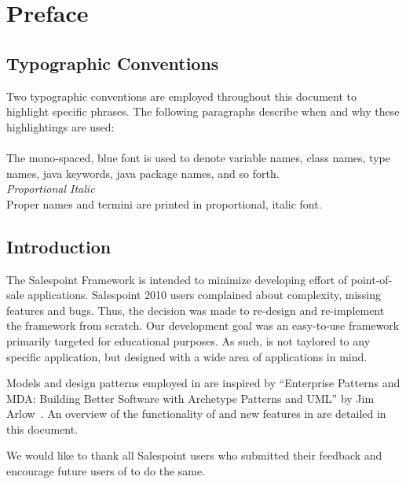 \chapter{Preface}

\section{Typographic Conventions}
Two typographic conventions are employed throughout this document to highlight specific phrases.
The following paragraphs describe when and why these highlightings are used:
\\

\\

The mono-spaced, blue font is used to denote variable names, class names, type names, java keywords, java package names, and so forth.
\\

\textit{Proportional Italic}
\\

Proper names and termini are printed in proportional, italic font.
\\

\section{Introduction}
The Salespoint Framework is intended to minimize developing effort of point-of-sale applications.
Salespoint 2010 users complained about complexity, missing features and bugs.
Thus, the decision was made to re-design and re-implement the framework from scratch.
Our development goal was an easy-to-use framework primarily targeted for educational purposes.
As such, \salespoint{} is not taylored to any specific application, but designed with a wide area of applications in mind.

Models and design patterns employed in \salespoint{} are inspired by ``Enterprise Patterns and MDA: Building Better Software with Archetype Patterns and UML'' by Jim Arlow~\cite{MDA}.
An overview of the functionality of and new features in \salespoint{} are detailed in this document.

We would like to thank all Salespoint users who submitted their feedback and encourage future users of \salespoint{} to do the same.
